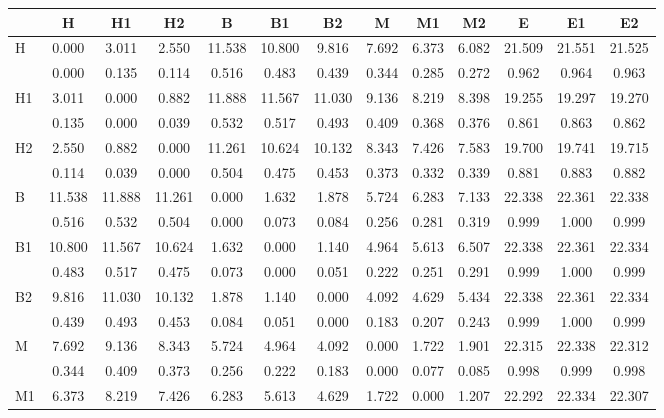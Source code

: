 \begin{table*}[h!]
\begin{center}
\begin{tabular}{| l | c | c | c | c | c | c | c | c | c | c | c | c |}\hline
 & H & H1 & H2 & B & B1 & B2 & M & M1 & M2 & E & E1 & E2 \\\hline
H & 0.000  & 3.011  & 2.550  & 11.538  & 10.800  & 9.816  & 7.692  & 6.373  & 6.082  & 21.509  & 21.551  & 21.525 \\\hline
 & 0.000  & 0.135  & 0.114  & 0.516  & 0.483  & 0.439  & 0.344  & 0.285  & 0.272  & 0.962  & 0.964  & 0.963 \\\hline
H1 & 3.011  & 0.000  & 0.882  & 11.888  & 11.567  & 11.030  & 9.136  & 8.219  & 8.398  & 19.255  & 19.297  & 19.270 \\\hline
 & 0.135  & 0.000  & 0.039  & 0.532  & 0.517  & 0.493  & 0.409  & 0.368  & 0.376  & 0.861  & 0.863  & 0.862 \\\hline
H2 & 2.550  & 0.882  & 0.000  & 11.261  & 10.624  & 10.132  & 8.343  & 7.426  & 7.583  & 19.700  & 19.741  & 19.715 \\\hline
 & 0.114  & 0.039  & 0.000  & 0.504  & 0.475  & 0.453  & 0.373  & 0.332  & 0.339  & 0.881  & 0.883  & 0.882 \\\hline
B & 11.538  & 11.888  & 11.261  & 0.000  & 1.632  & 1.878  & 5.724  & 6.283  & 7.133  & 22.338  & 22.361  & 22.338 \\\hline
 & 0.516  & 0.532  & 0.504  & 0.000  & 0.073  & 0.084  & 0.256  & 0.281  & 0.319  & 0.999  & 1.000  & 0.999 \\\hline
B1 & 10.800  & 11.567  & 10.624  & 1.632  & 0.000  & 1.140  & 4.964  & 5.613  & 6.507  & 22.338  & 22.361  & 22.334 \\\hline
 & 0.483  & 0.517  & 0.475  & 0.073  & 0.000  & 0.051  & 0.222  & 0.251  & 0.291  & 0.999  & 1.000  & 0.999 \\\hline
B2 & 9.816  & 11.030  & 10.132  & 1.878  & 1.140  & 0.000  & 4.092  & 4.629  & 5.434  & 22.338  & 22.361  & 22.334 \\\hline
 & 0.439  & 0.493  & 0.453  & 0.084  & 0.051  & 0.000  & 0.183  & 0.207  & 0.243  & 0.999  & 1.000  & 0.999 \\\hline
M & 7.692  & 9.136  & 8.343  & 5.724  & 4.964  & 4.092  & 0.000  & 1.722  & 1.901  & 22.315  & 22.338  & 22.312 \\\hline
 & 0.344  & 0.409  & 0.373  & 0.256  & 0.222  & 0.183  & 0.000  & 0.077  & 0.085  & 0.998  & 0.999  & 0.998 \\\hline
M1 & 6.373  & 8.219  & 7.426  & 6.283  & 5.613  & 4.629  & 1.722  & 0.000  & 1.207  & 22.292  & 22.334  & 22.307 \\\hline

\end{tabular}
\end{center}
\end{table*}
